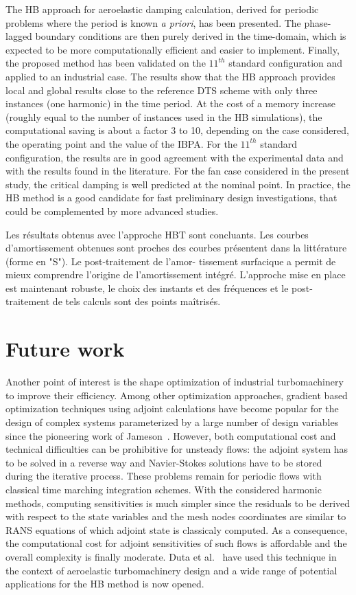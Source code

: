 The HB approach for aeroelastic damping calculation, derived for
periodic problems where the period is known \emph{a priori}, has been
presented. 
The phase-lagged boundary conditions are then purely derived in the
time-domain, which is expected to be more computationally efficient and 
easier to implement. 
Finally, the proposed method has been
validated on the $11^{th}$ standard configuration and applied to an
industrial case. The results show that the HB approach provides local
and global results close to the reference DTS scheme with only three
instances (one harmonic) in the time period.  At the cost of a memory
increase (roughly equal to the number of instances used in the HB
simulations), the computational saving is about a factor 3 to 10,
depending on the case considered, the operating point and the value of
the IBPA. For the $11^{th}$ standard configuration, the results are
in good agreement with the experimental data and with the results
found in the literature.  For the fan case considered in the present
study, the critical damping is well predicted at the nominal point.
In practice, the HB method is a good candidate for fast preliminary
design investigations, that could be complemented by more advanced
studies.

Les résultats obtenus avec l’approche HBT sont concluants. Les courbes d’amortissement obtenues sont proches des courbes présentent dans la littérature (forme en "S"). Le post-traitement de l’amor- tissement surfacique a permit de mieux comprendre l’origine de l’amortissement intégré. L’approche mise en place est maintenant robuste, le choix des instants et des fréquences et le post-traitement de tels calculs sont des points maîtrisés.

\section*{Future work}
\label{sec:perspectives}

Another point of interest is the shape optimization of industrial
turbomachinery to improve their efficiency. Among other optimization approaches, 
gradient based optimization
techniques using adjoint calculations have become popular for the
design of complex systems parameterized by a large number of design variables
since the pioneering work of Jameson~\cite{jameson88}. However,
both computational cost and technical difficulties can be prohibitive for
unsteady flows: the adjoint system has to be solved in a reverse way and
Navier-Stokes solutions have to be stored during the iterative process.
These problems remain for periodic flows with classical time marching 
integration schemes. With the considered harmonic methods, computing
sensitivities is much simpler since the residuals to be derived with 
respect to the state variables and the mesh nodes coordinates are 
similar to RANS equations of which adjoint state is classicaly computed. 
As a consequence, the
computational cost for adjoint sensitivities of such flows is affordable
and the overall complexity is finally moderate. Duta et al.~\cite{Duta01}
have used this technique in the context of aeroelastic turbomachinery
design and a wide range of potential applications for the HB method is now
opened.


